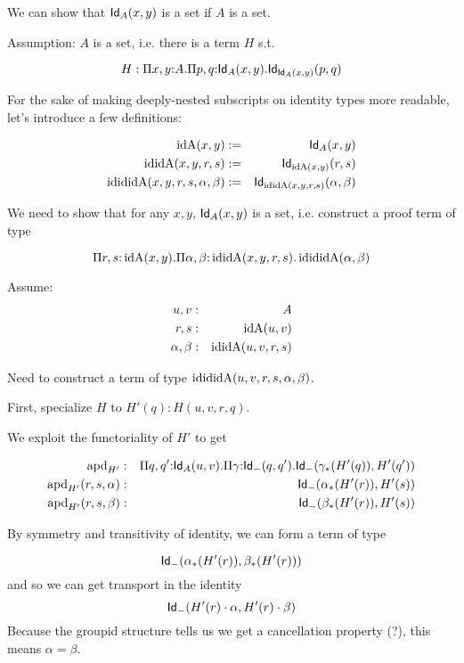 \documentclass[11pt]{article}
\begin{document}
We can show that $\mathsf{Id}_{A}(x,y)$ is a set if $A$ is a set.

Assumption: $A$ is a set, i.e. there is a term $H$ s.t.

\[
H : \Pi{x,y}{:}A.\Pi{p,q}{:}\mathsf{Id}_{A}(x,y).\mathsf{Id}_{\mathsf{Id}_{A}(x,y)}(p,q)
\]

For the sake of making deeply-nested subscripts on identity types more
readable, let's introduce a few definitions:

\newcommand{\idA}{\op{idA}}
\newcommand{\ididA}{\op{ididA}}
\newcommand{\idididA}{\op{idididA}}
\begin{eqnarray*}
\op{idA}(x,y) &:=& \Id{A}(x,y)\\
\op{ididA}(x,y,r,s) &:=& \Id{\idA(x,y)}(r,s) \\
\op{idididA}(x,y,r,s,\alpha,\beta) &:=& \Id{\ididA(x,y,r,s)}(\alpha,\beta)
\end{eqnarray*}

We need to show that for any $x,y$, 
$\mathsf{Id}_{A}(x,y)$ is a set, i.e. construct a proof term of type

\[
\Pi{r,s}{:}\idA(x,y).\Pi{\alpha,\beta}{:}\ididA(x,y,r,s).
\idididA(\alpha,\beta)
\]

Assume:
\begin{eqnarray*}
u,v &:& A\\
r,s &:& \idA(u,v)\\
\alpha,\beta &:& \ididA(u,v,r,s)
\end{eqnarray*}

Need to construct a term of type $\idididA(u,v,r,s,\alpha,\beta)$.

First, specialize $H$ to $H'(q) : H(u,v,r,q)$.

We exploit the functoriality of $H'$ to get

\begin{eqnarray*}
\operatorname{apd}_{H'} &:& \Pi{q,q'}{:}\mathsf{Id}_{A}(u,v).
                \Pi{\gamma}{:}\mathsf{Id}_{-}(q,q').
                  \mathsf{Id}_{-}(\gamma_{*}(H'(q)), H'(q'))\\
\operatorname{apd}_{H'}(r,s,\alpha) &:& \mathsf{Id}_{-}(\alpha_{*}(H'(r)), H'(s))\\
\operatorname{apd}_{H'}(r,s,\beta) &:& \mathsf{Id}_{-}(\beta_*{}(H'(r)), H'(s))
\end{eqnarray*}

By symmetry and transitivity of identity, we can form a term of type

\[
\mathsf{Id}_{-}(\alpha_*(H'(r)), \beta_*(H'(r)))
\]
and so we can get transport in the identity
\[
\mathsf{Id}_{-}(H'(r)\cdot \alpha, H'(r)\cdot\beta)
\]
Because the groupid structure tells us we get a cancellation property (?),
this means $\alpha = \beta$.
\end{document}
